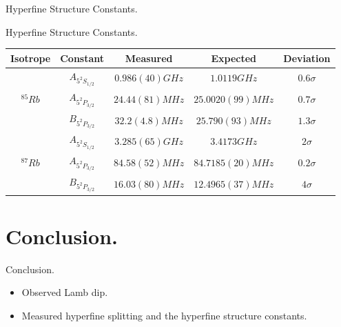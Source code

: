 \documentclass{beamer}
\def\timeleft{15:00->14:55}
\begin{document}
\begin{frame}{Hyperfine Structure Constants.}
  \begin{block}{Hyperfine Structure Constants.}
    \begin{center}
      \begin{tabular}{|c|c|c|c|c|}
        \hline
        Isotrope&Constant&Measured&Expected&Deviation\\\hline
        &$A_{5^2S_{1/2}}$&$0.986(40)GHz$&$1.0119GHz$&$0.6\sigma$\\\cline{2-5}
        ${}^{85}Rb$&$A_{5^2P_{3/2}}$&$24.44(81)MHz$&$25.0020(99)MHz$&$0.7\sigma$\\\cline{2-5}
        &$B_{5^2P_{3/2}}$&$32.2(4.8)MHz$&$25.790(93)MHz$&$1.3\sigma$\\\hline
        &$A_{5^2S_{1/2}}$&$3.285(65)GHz$&$3.4173GHz$&$2\sigma$\\\cline{2-5}
        ${}^{87}Rb$&$A_{5^2P_{3/2}}$&$84.58(52)MHz$&$84.7185(20)MHz$&$0.2\sigma$\\\cline{2-5}
        &$B_{5^2P_{3/2}}$&$16.03(80)MHz$&$12.4965(37)MHz$&$4\sigma$\\\hline
      \end{tabular}
    \end{center}
  \end{block}
\end{frame}

\def\timeleft{0:30->0:00}
\section{Conclusion.}
\begin{frame}{Conclusion.}
  \begin{block}{}
    \begin{itemize}[<+->]
    \item
      Observed Lamb dip.
    \item
      Measured hyperfine splitting and the hyperfine structure constants.
    \end{itemize}
  \end{block}
\end{frame}

\begin{frame}{}
\end{frame}

\begin{frame}{}
\end{frame}
\end{document}
